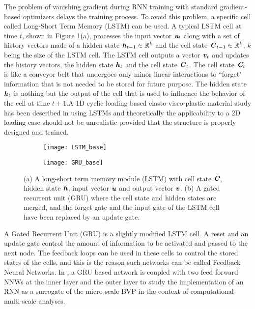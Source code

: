 The problem of vanishing gradient during RNN training with standard gradient-based optimizers\cite{kolenGradientFlowRecurrent2001} delays the training process. To avoid this problem, a specific cell called Long-Short Term Memory (LSTM) can be used\cite{hochreiterLongShortTermMemory1997}. A typical LSTM cell at time $ t $, shown in Figure \ref{fig-nn-lstm}(a), processes the input vector $ \textit{\textbf{u}}_{t} $ along with a set of history vectors made of a hidden state $ \textbf{\textit{h}}_{t-1}\in\mathbb{R}^k $ and the cell state $ \textbf{\textit{C}}_{t-1}\in\mathbb{R}^k $, $ k $ being the size of the LSTM cell. The LSTM cell outputs a vector $ \textbf{\textit{v}}_t $ and updates the history vectors, the hidden state $ \textbf{\textit{h}}_{t} $ and the cell state $ \textbf{\textit{C}}_{t} $. The cell state $ \textit{\textbf{C}}_t $ is like a conveyor belt that undergoes only minor linear interactions to ``forget" information that is not needed to be stored for future purpose. The hidden state $ \textbf{\textit{h}}_t $ is nothing but the output of the cell that is used to influence the behavior of the cell at time $ t+1 .$A 1D cyclic loading based elasto-visco-plastic material study has been described in \cite{ghavamianAcceleratingMultiscaleFinite2019} using LSTMs and theoretically the applicability to a 2D loading case should not be unrealistic provided that 
the structure is properly designed and trained.
\enlargethispage{\baselineskip}

\begin{figure}
	\centering
	\begin{subfigure}[t]{0.51\textwidth}
		\texttt{[image: LSTM\_base]}
		\caption{}
	\end{subfigure}
	\begin{subfigure}[t]{0.45\textwidth}
		\texttt{[image: GRU\_base]}
		\caption{}
	\end{subfigure}
	\caption{(a) A long-short term memory module (LSTM) with cell state $ \textit{\textbf{C}} $, hidden state $ \textbf{\textit{h}} $, input vector $ \textbf{\textit{u}} $ and output vector $ \textbf{\textit{v}} $. (b) A gated recurrent unit (GRU) where the cell state and hidden states are merged, and the forget gate and the input gate of the LSTM cell have been replaced by an update gate.}\label{fig-nn-lstm}
\end{figure}

A Gated Recurrent Unit (GRU) is a slightly modified LSTM cell\cite{choLearningPhraseRepresentations2014}. A reset and an update gate control the amount of information to be activated and passed to the next node. The feedback loops can be used in these cells to control the stored states of the cells, and this is the reason such networks can be called Feedback Neural Networks. In \cite{wuRecurrentNeuralNetworkaccelerated2020}, a GRU based network is coupled with two feed forward NNWs at the inner layer and the outer layer to study the implementation of an RNN as a surrogate of the micro-scale BVP in the context of computational multi-scale analyses. 

